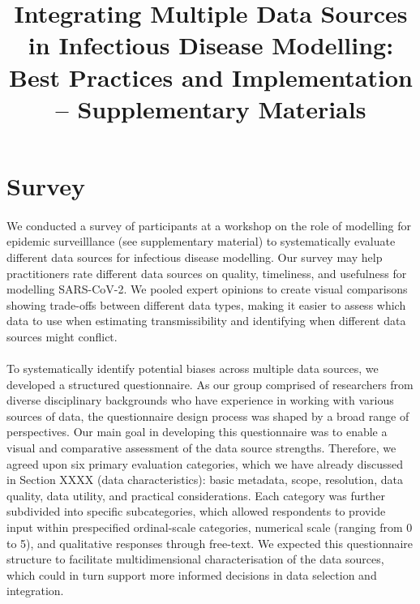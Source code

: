 \documentclass{article}
\title{Integrating Multiple Data Sources in Infectious Disease Modelling: Best Practices and Implementation -- Supplementary Materials}
\author{}
\date{}
\begin{document}
\maketitle

\section{Survey}
\paragraph{}We conducted a survey of participants at a workshop on the role of modelling for epidemic surveilllance (see supplementary material) to systematically evaluate different data sources for infectious disease modelling.
Our survey may help practitioners rate different data sources on quality, timeliness, and usefulness for modelling SARS-CoV-2. We pooled expert opinions to create visual comparisons showing trade-offs between different data types, making it easier to assess which data to use when estimating transmissibility and identifying when different data sources might conflict.

\paragraph{}To systematically identify potential biases across multiple data sources, we developed a structured questionnaire. As our group comprised of researchers from diverse disciplinary backgrounds who have experience in working with various sources of data, the questionnaire design process was shaped by a broad range of perspectives. Our main goal in developing this questionnaire was to enable a visual and comparative assessment of the data source strengths. Therefore, we agreed upon six primary evaluation categories, which we have already discussed in Section XXXX (data characteristics): basic metadata, scope, resolution, data quality, data utility, and practical considerations. Each category was further subdivided into specific subcategories, which allowed respondents to provide input within prespecified ordinal-scale categories, numerical scale (ranging from 0 to 5), and qualitative responses through free-text. We expected this questionnaire structure to facilitate multidimensional characterisation of the data sources, which could in turn support more informed decisions in data selection and integration. 
\end{document}
